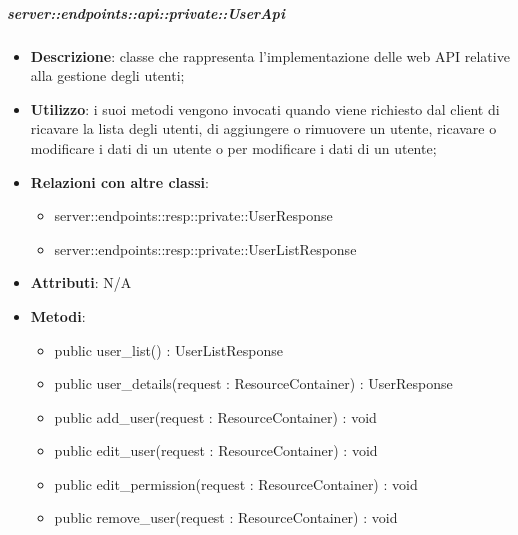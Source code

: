     \subparagraph{server::endpoints::api::private::UserApi} %
    \label{subp:bdsm_app_server_endpoints_api_private_userapi}
    \begin{itemize}
      \item \textbf{Descrizione}: classe che rappresenta l'implementazione delle web API relative alla gestione degli utenti;
      \item \textbf{Utilizzo}: i suoi metodi vengono invocati quando viene richiesto dal client di ricavare la lista degli utenti, di aggiungere o rimuovere un utente, ricavare o modificare i dati di un utente o per modificare i dati di un utente;
      \item \textbf{Relazioni con altre classi}:
        \begin{itemize}
          \item server::endpoints::resp::private::UserResponse
          \item server::endpoints::resp::private::UserListResponse
        \end{itemize}
		\item \textbf{Attributi}: N/A
		\item \textbf{Metodi}:   
			\begin{itemize}
				\item public user\_list() : UserListResponse
				\item public user\_details(request : ResourceContainer) : UserResponse
				\item public add\_user(request : ResourceContainer) : void
				\item public edit\_user(request : ResourceContainer) : void
				\item public edit\_permission(request : ResourceContainer) : void
				\item public remove\_user(request : ResourceContainer) : void
     	 \end{itemize}
      \end{itemize}

